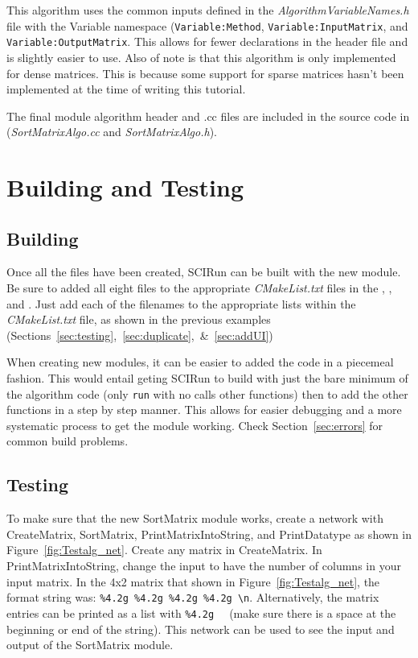 \documentclass[fleqn,11pt,openany]{book}
\begin{document}
This algorithm uses the common inputs defined in the \emph{AlgorithmVariableNames.h} file with the Variable namespace (\verb|Variable:Method|, \verb|Variable:InputMatrix|, and \verb|Variable:OutputMatrix|.  
This allows for fewer declarations in the header file and is slightly easier to use.  
Also of note is that this algorithm is only implemented for dense matrices.
This is because some support for sparse matrices hasn't been implemented at the time of writing this tutorial. 

The final module algorithm header and .cc files are included in the source code in \emph{} (\emph{SortMatrixAlgo.cc} and \emph{SortMatrixAlgo.h}).

\section{Building and Testing}
\label{sec:algo_building}

\subsection{Building}

Once all the files have been created, SCIRun can be built with the new module.  
Be sure to added all eight files to the appropriate \emph{CMakeList.txt} files in the \emph{}, \emph{}, and \emph{}.  
Just add each of the filenames to the appropriate lists within the \emph{CMakeList.txt} file, as shown in the previous examples (Sections~\ref{sec:testing},~\ref{sec:duplicate},~\&~\ref{sec:addUI})

When creating new modules, it can be easier to added the code in a piecemeal fashion.
This would entail geting SCIRun to build with just the bare minimum of the algorithm code (only \verb|run| with no calls other functions) then to add the other functions in a step by step manner.  
This allows for easier debugging and a more systematic process to get the module working.  
Check Section~\ref{sec:errors} for common build problems.

\subsection{Testing}

To make sure that the new SortMatrix module works, create a network with CreateMatrix, SortMatrix, PrintMatrixIntoString, and PrintDatatype as shown in Figure~\ref{fig:Testalg_net}.  
Create any matrix in CreateMatrix.
In PrintMatrixIntoString, change the input to have the number of columns in your input matrix.
In the 4x2 matrix that shown in Figure~\ref{fig:Testalg_net}, the format string was: \verb|%4.2g %4.2g %4.2g %4.2g \n|.
Alternatively, the matrix entries can be printed as a list with \verb|%4.2g  | (make sure there is a space at the beginning or end of the string).
This network can be used to see the input and output of the SortMatrix module.  
\end{document}
